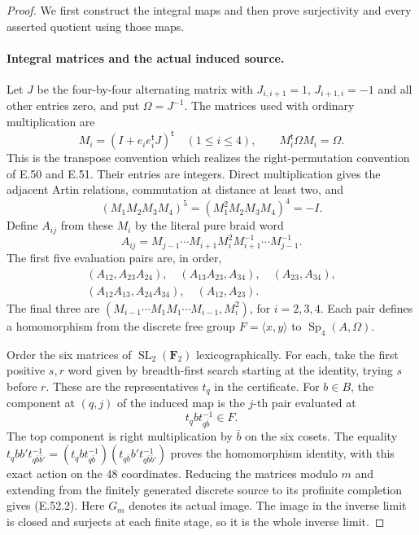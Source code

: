 \begin{proof}
We first construct the integral maps and then prove
surjectivity and every asserted quotient using those maps.

\paragraph{Integral matrices and the actual induced source.}
Let $J$ be the four-by-four alternating matrix with
$J_{i,i+1}=1$, $J_{i+1,i}=-1$ and all other entries
zero, and put $\Omega=J^{-1}$.
The matrices used with ordinary multiplication are
\[
 M_i=(I+e_i e_i^{\mathsf t}J)^{\mathsf t}
       \quad(1\leq i\leq4),\qquad
 M_i^{\mathsf t}\Omega M_i=\Omega.
 \tag{E.52.7}
\]
This is the transpose convention which realizes the
right-permutation convention of E.50 and E.51.
Their entries are integers. Direct multiplication
gives the adjacent Artin relations, commutation at
distance at least two, and
\[
 (M_1M_2M_3M_4)^5
       =(M_1^2M_2M_3M_4)^4=-I.
 \tag{E.52.8}
\]
Define $A_{ij}$ from these $M_i$ by the literal pure
braid word
\[
 A_{ij}=M_{j-1}\cdots M_{i+1}M_i^2
                          M_{i+1}^{-1}\cdots M_{j-1}^{-1}.
 \tag{E.52.9}
\]
The first five evaluation pairs are, in order,
\[
 \begin{gathered}
 (A_{12},A_{23}A_{24}),\quad
 (A_{13}A_{23},A_{34}),\quad(A_{23},A_{34}),\\
 (A_{12}A_{13},A_{24}A_{34}),\quad(A_{12},A_{23}).
 \end{gathered}
 \tag{E.52.10}
\]
The final three are
$(M_{i-1}\cdots M_1M_1\cdots M_{i-1},M_i^2)$,
for $i=2,3,4$.
Each pair defines a homomorphism from the discrete
free group $F=\langle x,y\rangle$ to
$\operatorname{Sp}_4(A,\Omega)$.

Order the six matrices of $\operatorname{SL}_2(\mathbf F_2)$
lexicographically. For each, take the first positive
$s,r$ word given by breadth-first search starting at
the identity, trying $s$ before $r$.
These are the representatives $t_q$ in the certificate.
For $b\in B$, the component at $(q,j)$ of the induced
map is the $j$-th pair evaluated at
\[
                       t_q b t_{q\bar b}^{-1}\in F.
 \tag{E.52.11}
\]
The top component is right multiplication by $\bar b$
on the six cosets. The equality
$t_qbb't_{q\bar b\bar b'}^{-1}
 =(t_qbt_{q\bar b}^{-1})(t_{q\bar b}b't_{q\bar b\bar b'}^{-1})$
proves the homomorphism identity, with this exact action
on the 48 coordinates. Reducing the matrices modulo
$m$ and extending from the finitely generated discrete
source to its profinite completion gives
\textup{(E.52.2)}. Here $G_m$ denotes its actual image.
The image in the inverse limit is closed and surjects
at each finite stage, so it is the whole inverse limit.


\end{proof}
